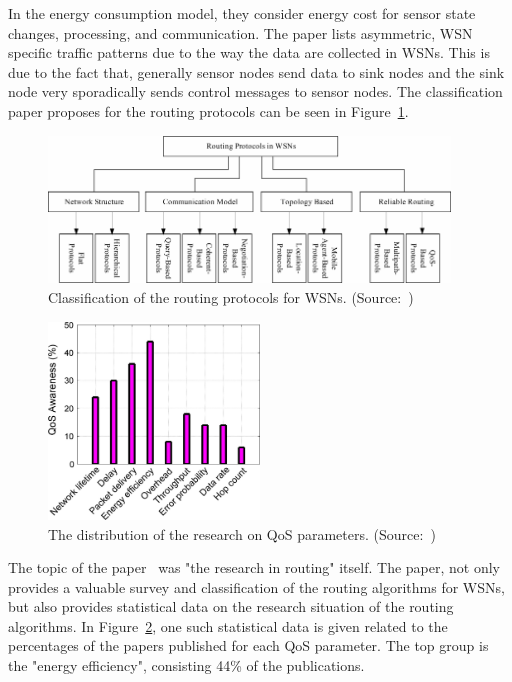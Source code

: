 \documentclass[12pt, oneandhalf, chaparabic, sees, ms]{metu}
\begin{document}
In the energy consumption model, they consider energy cost for sensor state changes, processing, and communication. The paper lists
asymmetric, WSN specific traffic patterns due to the way the data are collected in WSNs. 
This is due to the fact that, generally sensor nodes send data to sink nodes and the sink node
very sporadically sends control messages to sensor nodes.
The classification paper proposes for the routing protocols can be seen in Figure~\ref{fig:tax-pantazis}.
% 
%
%
\begin{figure}[!htbp]
 \begin{center}
  \includegraphics[width=0.95\textwidth]{tax-pantazis.png}
 \end{center}
 \caption{Classification of the routing protocols for WSNs. (Source:~\protect\cite{pantazis2013})}
  \label{fig:tax-pantazis}
\end{figure}
% 
%
%
\vspace{-0.7cm}
% 
%
%
\begin{figure}[!htbp]
 \begin{center}
  \includegraphics[width=0.5\textwidth]{routing-research.png}
 \end{center}
 \caption{The distribution of the research on QoS parameters. (Source:~\protect\cite{sarkar2016})}
  \label{fig:routing-research}
\end{figure}
% 
%
%
\vspace{-0.7cm}

The topic of the paper~\cite{sarkar2016} was "the research in routing" itself.
The paper, not only provides a valuable survey and classification of the routing algorithms for WSNs, but also provides statistical data
on the research situation of the routing algorithms. In Figure~\ref{fig:routing-research}, one such statistical data is given related 
to the percentages of the papers published for each QoS parameter. The top group is the "energy efficiency", consisting 44\% of the publications. 
\end{document}
